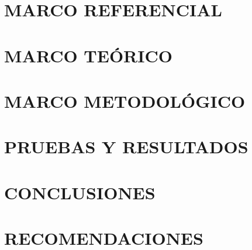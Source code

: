 \documentclass[letterpaper,titlepage,12pt,oneside,spanish,final]{report_eie}
\begin{document}
%
%

\chapter{MARCO REFERENCIAL}\label{CAP:referencial}
%

\chapter{MARCO TEÓRICO}\label{CAP:marco_teor}
%

\chapter{MARCO METODOLÓGICO}\label{CAP:marco_met}
%

\chapter{PRUEBAS Y RESULTADOS}\label{CAP:pruebas}


\chapter{CONCLUSIONES}\label{CAP:conclu}


\chapter{RECOMENDACIONES}\label{CAP:recomendaciones}


%
\end{document}
